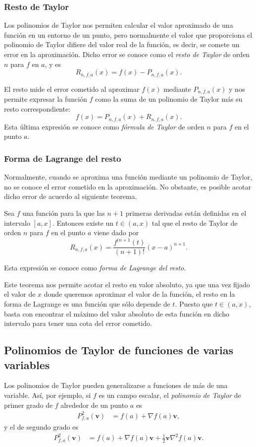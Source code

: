\subsubsection*{Resto de Taylor}
Los polinomios de Taylor nos permiten calcular el valor aproximado de una función en un entorno de un punto, pero normalmente el valor que proporciona el polinomio de Taylor difiere del valor real de la función, es decir, se comete un error en la aproximación. Dicho error se conoce como el \emph{resto de Taylor} de orden $n$ para $f$ en $a$, y es
\[
R_{n,f,a}(x)=f(x)-P_{n,f,a}(x).
\]

El resto mide el error cometido al aproximar $f(x)$ mediante $P_{n,f,a}(x)$ y nos permite expresar la función $f$ como la suma de un polinomio de Taylor más su resto correspondiente:
\[
f(x)=P_{n,f,a}(x)+R_{n,f,a}(x).
\]
Esta última expresión se conoce como \emph{fórmula de Taylor} de orden $n$ para $f$ en el punto $a$.

\subsubsection*{Forma de Lagrange del resto}
Normalmente, cuando se aproxima una función mediante un polinomio de Taylor, no se conoce el error cometido en la aproximación. No obstante, es posible acotar dicho error de acuerdo al siguiente teorema.

\begin{teorema}
Sea $f$ una función para la que las $n+1$ primeras derivadas están definidas en el intervalo $[a,x]$. Entonces existe un
$t\in(a,x)$ tal que el resto de Taylor de orden $n$ para $f$ en el punto $a$ viene dado por
\[
R_{n,f,a}(x)=\frac{f^{(n+1}(t)}{(n+1)!}(x-a)^{n+1}.
\]
\end{teorema}
Esta expresión se conoce como \emph{forma de Lagrange del resto}.

Este teorema nos permite acotar el resto en valor absoluto, ya que una vez fijado el valor de $x$ donde queremos aproximar el valor de la función, el resto en la forma de Lagrange es una función que sólo depende de $t$. Puesto que $t\in (a,x)$, basta con encontrar el máximo del valor absoluto de esta función en dicho intervalo para tener una cota del error cometido.

\subsection{Polinomios de Taylor de funciones de varias variables}
Los polinomios de Taylor pueden generalizarse a funciones de más de una variable. Así, por ejemplo, si $f$ es un campo
escalar, el \emph{polinomio de Taylor} de primer grado de $f$ alrededor de un punto $a$ es
\begin{align*}
P^2_{f,a}(\mathbf{v})&=f(a)+\nabla f(a)\mathbf{v},
\end{align*}
y el de segundo grado es
\begin{align*}
P^2_{f,a}(\mathbf{v})&=f(a)+\nabla f(a)\mathbf{v}+\frac{1}{2}\mathbf{v}\nabla^2f(a)\mathbf{v}.
\end{align*}


